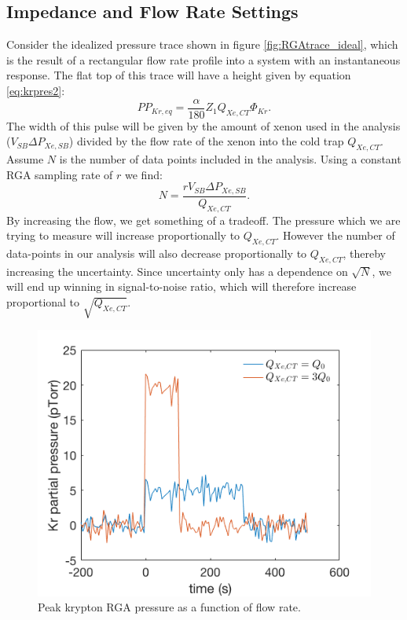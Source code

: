 \subsection{Impedance and Flow Rate Settings}\label{sec:imp_tune}
Consider the idealized pressure trace shown in figure \ref{fig:RGAtrace_ideal}, which is the result of a rectangular flow rate profile into a system with an instantaneous response. The flat top of this trace will have a height given by equation \ref{eq:krpres2}:
\begin{equation}
PP_{Kr,eq}=\frac{\alpha}{180}Z_{1}Q_{Xe,CT}\Phi_{Kr}.
\end{equation}
The width of this pulse will be given by the amount of xenon used in the analysis ($V_{SB}\Delta P_{Xe,SB}$) divided by the flow rate of the xenon into the cold trap $Q_{Xe,CT}$.  Assume $N$ is the number of data points included in the analysis. Using a constant RGA sampling rate of $r$ we find: 
\begin{equation}
N=\frac{rV_{SB}\Delta P_{Xe,SB}}{Q_{Xe,CT}}.
\end{equation}
By increasing the flow, we get something of a tradeoff. The pressure which we are trying to measure will increase proportionally to $Q_{Xe,CT}$. However the number of data-points in our analysis will also decrease proportionally to $Q_{Xe,CT}$, thereby increasing the uncertainty. Since uncertainty only has a dependence on $\sqrt{N}$, we will end up winning in signal-to-noise ratio, which will therefore increase proportional to $\sqrt{Q_{Xe,CT}}$. 
\begin{figure}[h]
  \includegraphics[width=\linewidth]{Figures/RGAtrace_ideal.png}
  \caption{Peak krypton RGA pressure as a function of flow rate.  }
  \label{fig:flowresponse1x}
\end{figure}

